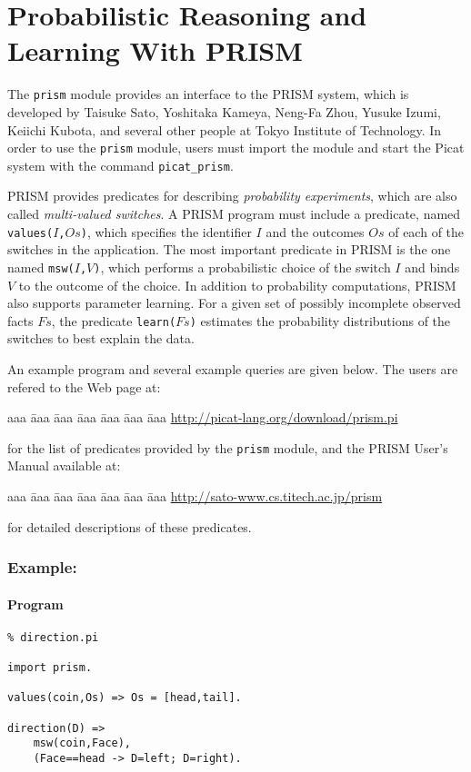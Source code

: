 \chapter{Probabilistic Reasoning and Learning With PRISM}\label{chapter:prism}
The {\tt prism} module provides an interface to the PRISM system, which is developed by Taisuke Sato, Yoshitaka Kameya, Neng-Fa Zhou, Yusuke Izumi, Keiichi Kubota, and several other people at Tokyo Institute of Technology. In order to use the {\tt prism} module, users must import the module and start the Picat system with the command {\tt picat\_prism}.

PRISM provides predicates for describing {\it probability experiments}, which are also called {\it multi-valued switches}. A PRISM program must include a predicate, named {\tt values($I$,$Os$)}, which specifies the identifier $I$ and the outcomes $Os$ of each of the switches in the application. The most important predicate in PRISM is the one named {\tt msw($I$,$V$)}, which performs a probabilistic choice of the switch $I$ and binds $V$ to the outcome of the choice. In addition to probability computations, PRISM also supports parameter learning. For a given set of possibly incomplete observed facts $Fs$, the predicate {\tt learn($Fs$)} estimates the probability distributions of the switches to best explain the data.

An example program and several example queries are given below. The users are refered to the Web page at:
\begin{tabbing}
aaa \= aaa \= aaa \= aaa \= aaa \= aaa \= aaa \kill
\> \url{http://picat-lang.org/download/prism.pi} 
\end{tabbing}
for the list of predicates provided by the {\tt prism} module, and the PRISM User's Manual available at:
\begin{tabbing}
aaa \= aaa \= aaa \= aaa \= aaa \= aaa \= aaa \kill
\> \url{http://sato-www.cs.titech.ac.jp/prism}
\end{tabbing}
for detailed descriptions of these predicates.

\subsection*{Example:}
\subsubsection*{Program}
\begin{verbatim}
% direction.pi

import prism.

values(coin,Os) => Os = [head,tail].

direction(D) =>
    msw(coin,Face),
    (Face==head -> D=left; D=right).
\end{verbatim}

